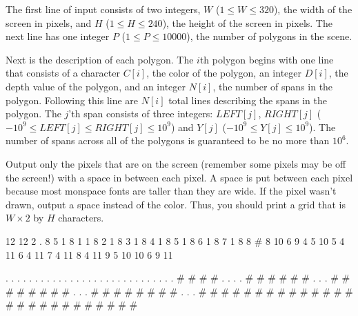 \begin{formalin}
The first line of input consists of two integers, $W$ ($1 \leq W \leq 320$), the width of the screen in pixels, and $H$ ($1 \leq H \leq 240$), the height of the screen in pixels. The next line has one integer $P$ ($1 \leq P \leq 10000$), the number of polygons in the scene.

Next is the description of each polygon. The $i$th polygon begins with one line that consists of a character $C[i]$, the color of the polygon, an integer $D[i]$, the depth value of the polygon, and an integer $N[i]$, the number of spans in the polygon. Following this line are $N[i]$ total lines describing the spans in the polygon. The $j$'th span consists of three integers: $LEFT[j]$, $RIGHT[j]$ ($-10^{9} \leq LEFT[j] \leq RIGHT[j] \leq 10^{9}$) and $Y[j]$ ($-10^{9} \leq Y[j] \leq 10^{9}$). The number of spans across all of the polygons is guaranteed to be no more than $10^{6}$.
\end{formalin}

\begin{formalout}


\end{formalout}

Output only the pixels that are on the screen (remember some pixels may be off the screen!) with a space in between each pixel. A space is put between each pixel because most monspace fonts are taller than they are wide. If the pixel wasn't drawn, output a space instead of the color. Thus, you should print a grid that is $W \times 2$ by $H$ characters.

\begin{datain}
12 12
2
. 8 5
1 8 1
1 8 2
1 8 3
1 8 4
1 8 5
1 8 6
1 8 7
1 8 8
# 8 10
6 9 4
5 10 5
4 11 6
4 11 7
4 11 8
4 11 9
5 10 10
6 9 11
\end{datain}
\begin{dataout}
                        
  . . . . . . . .       
  . . . . . . . .       
  . . . . . . . .       
  . . . . . # # # #     
  . . . . # # # # # #   
  . . . # # # # # # # # 
  . . . # # # # # # # # 
  . . . # # # # # # # # 
        # # # # # # # # 
          # # # # # #   
            # # # #     

\end{dataout}

